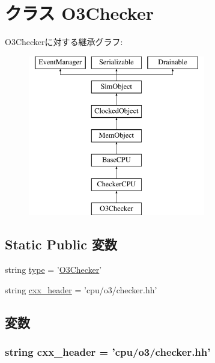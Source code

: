 \hypertarget{classO3Checker_1_1O3Checker}{
\section{クラス O3Checker}
\label{classO3Checker_1_1O3Checker}
}
O3Checkerに対する継承グラフ:\begin{figure}[H]
\begin{center}
\leavevmode
\includegraphics[height=7cm]{classO3Checker_1_1O3Checker}
\end{center}
\end{figure}
\subsection*{Static Public 変数}
\begin{DoxyCompactItemize}
\item 
string \hyperlink{classO3Checker_1_1O3Checker_acce15679d830831b0bbe8ebc2a60b2ca}{type} = '\hyperlink{classO3Checker_1_1O3Checker}{O3Checker}'
\item 
string \hyperlink{classO3Checker_1_1O3Checker_a17da7064bc5c518791f0c891eff05fda}{cxx\_\-header} = 'cpu/o3/checker.hh'
\end{DoxyCompactItemize}


\subsection{変数}
\hypertarget{classO3Checker_1_1O3Checker_a17da7064bc5c518791f0c891eff05fda}{
\subsubsection[{cxx\_\-header}]{\setlength{\rightskip}{0pt plus 5cm}string {\bf cxx\_\-header} = 'cpu/o3/checker.hh'}}
\label{classO3Checker_1_1O3Checker_a17da7064bc5c518791f0c891eff05fda}


